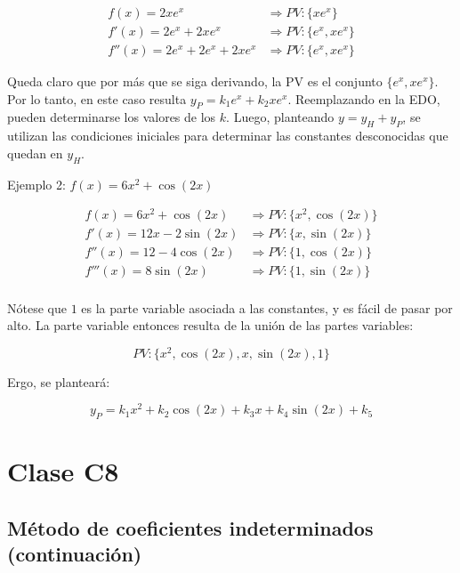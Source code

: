 \documentclass{article}
\begin{document}
\begin{equation}
\begin{array}{ll}
f(x) = 2 x e^x &\Rightarrow PV: \{x e^x\} \\
f'(x) = 2 e^x + 2 x e^x &\Rightarrow PV: \{e^x, x e^x\} \\
f''(x) = 2 e^x + 2 e^x + 2 x e^x &\Rightarrow PV: \{e^x, x e^x\}
\end{array}
\end{equation}

Queda claro que por más que se siga derivando, la PV es el conjunto $\{e^x, x e^x\}$. Por lo tanto, en este caso resulta $y_P = k_1 e^x + k_2 x e^x$. Reemplazando en la EDO, pueden determinarse los valores de los $k$. Luego, planteando $y = y_H + y_P$, se utilizan las condiciones iniciales para determinar las constantes desconocidas que quedan en $y_H$.

Ejemplo 2: $f(x) = 6 x^2 + \cos (2x)$

\begin{equation}
\begin{array}{ll}
f(x) = 6 x^2 + \cos(2 x) &\Rightarrow PV: \{x^2, \cos(2 x)\} \\
f'(x) = 12 x - 2 \sin(2 x) &\Rightarrow PV: \{x, \sin(2 x)\} \\
f''(x) = 12 - 4 \cos(2 x) &\Rightarrow PV: \{1, \cos(2 x)\} \\
f'''(x) = 8 \sin(2 x) &\Rightarrow PV: \{1, \sin(2 x)\} \\
\end{array}
\end{equation}

Nótese que $1$ es la parte variable asociada a las constantes, y es fácil de pasar por alto. La parte variable entonces resulta de la unión de las partes variables:

\begin{equation}
PV: \{x^2, \cos(2 x), x, \sin(2 x), 1\}
\end{equation}

Ergo, se planteará:

\begin{equation}
y_P = k_1 x^2 + k_2 \cos(2x) + k_3 x + k_4 \sin(2 x) + k_5
\end{equation}

\section{Clase C8}

\subsection{Método de coeficientes indeterminados (continuación)}
\end{document}
